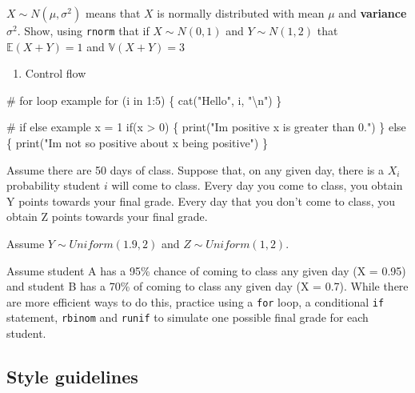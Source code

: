 \documentclass[
  letterpaper,
  DIV=11,
  numbers=noendperiod]{scrartcl}
\newenvironment{Shaded}{\begin{snugshade}}{\end{snugshade}}
\newcommand{\CommentTok}[1]{\textcolor[rgb]{0.37,0.37,0.37}{#1}}
\newcommand{\ControlFlowTok}[1]{\textcolor[rgb]{0.00,0.23,0.31}{#1}}
\newcommand{\DecValTok}[1]{\textcolor[rgb]{0.68,0.00,0.00}{#1}}
\newcommand{\FunctionTok}[1]{\textcolor[rgb]{0.28,0.35,0.67}{#1}}
\newcommand{\NormalTok}[1]{\textcolor[rgb]{0.00,0.23,0.31}{#1}}
\newcommand{\OtherTok}[1]{\textcolor[rgb]{0.00,0.23,0.31}{#1}}
\newcommand{\SpecialCharTok}[1]{\textcolor[rgb]{0.37,0.37,0.37}{#1}}
\newcommand{\StringTok}[1]{\textcolor[rgb]{0.13,0.47,0.30}{#1}}
\providecommand{\tightlist}{%
  \setlength{\itemsep}{0pt}\setlength{\parskip}{0pt}}\usepackage{longtable,booktabs,array}
\begin{document}
\(X \sim N(\mu, \sigma^2)\) means that \(X\) is normally distributed
with mean \(\mu\) and \textbf{variance} \(\sigma^2\). Show, using
\texttt{rnorm} that if \(X \sim N(0, 1)\) and \(Y \sim N(1, 2)\) that
\(\mathbb{E}(X + Y) = 1\) and \(\mathbb{V}(X + Y) = 3\)

\begin{enumerate}
\def\labelenumi{\arabic{enumi}.}
\setcounter{enumi}{3}
\tightlist
\item
  Control flow
\end{enumerate}

\begin{Shaded}
\begin{Highlighting}[]
\CommentTok{\# for loop example}
\ControlFlowTok{for}\NormalTok{ (i }\ControlFlowTok{in} \DecValTok{1}\SpecialCharTok{:}\DecValTok{5}\NormalTok{) \{}
  \FunctionTok{cat}\NormalTok{(}\StringTok{"Hello"}\NormalTok{, i, }\StringTok{"}\SpecialCharTok{\textbackslash{}n}\StringTok{"}\NormalTok{)}
\NormalTok{\}}

\CommentTok{\# if else example}
\NormalTok{x }\OtherTok{=} \DecValTok{1}
\ControlFlowTok{if}\NormalTok{(x }\SpecialCharTok{\textgreater{}} \DecValTok{0}\NormalTok{) \{}
  \FunctionTok{print}\NormalTok{(}\StringTok{"I\textquotesingle{}m positive x is greater than 0."}\NormalTok{)}
\NormalTok{\} }\ControlFlowTok{else}\NormalTok{ \{}
  \FunctionTok{print}\NormalTok{(}\StringTok{"I\textquotesingle{}m not so positive about x being positive"}\NormalTok{)}
\NormalTok{\}}
\end{Highlighting}
\end{Shaded}

Assume there are 50 days of class. Suppose that, on any given day, there
is a \(X_i\) probability student \(i\) will come to class. Every day you
come to class, you obtain Y points towards your final grade. Every day
that you don't come to class, you obtain Z points towards your final
grade.

Assume \(Y \sim Uniform(1.9, 2)\) and \(Z \sim Uniform(1, 2)\).

Assume student A has a 95\% chance of coming to class any given day (X =
0.95) and student B has a 70\% of coming to class any given day (X =
0.7). While there are more efficient ways to do this, practice using a
\texttt{for} loop, a conditional \texttt{if} statement, \texttt{rbinom}
and \texttt{runif} to simulate one possible final grade for each
student.

\hypertarget{style-guidelines}{%
\subsection{Style guidelines}\label{style-guidelines}}
\end{document}

